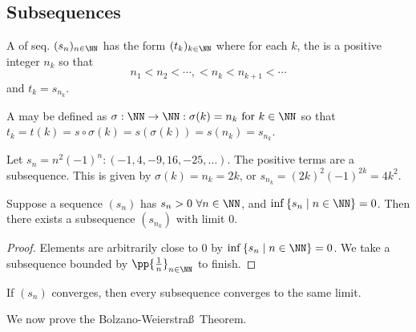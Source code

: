 \documentclass[11pt]{scrartcl}
\numberwithin{equation}{section}
\begin{document}
\subsection{Subsequences}
\begin{definition}
    A  of seq. $(s_n)_{n\in\NN}$ has the form 
    $(t_k)_{k\in\NN}$ where for each $k$, the is a positive integer 
    $n_k$ so that 
    \[ n_1 < n_2 <\cdots,< n_k<n_{k+1}<\cdots\]
    and $t_k = s_{n_k}$.
    
    A  may be defined as 
    $\sigma : \NN \rightarrow \NN: \sigma(k) = n_k \text{ for } k \in \NN$
    so that $t_k = t(k) =  s \circ \sigma (k) = s(\sigma(k)) = s(n_k) = s_{n_k}$.
\end{definition}
\begin{example}
    Let $s_n = n^2(-1)^n : (-1,4,-9,16,-25,\dots)$.
    The positive terms are a subsequence. This is given by 
    $\sigma(k) = n_k=2k$, or $s_{n_k}=(2k)^2(-1)^{2k} = 4k^2$.
\end{example}

\begin{proposition}
    Suppose a sequence $(s_n)$ has $s_n>0\ \forall n \in \NN$,
    and $\inf \left\{s_n\mid n\in \NN\right\} = 0$.
    Then there exists a subsequence $(s_{n_k})$ with limit $0$.
\end{proposition}

\begin{proof}
    Elements are arbitrarily close to $0$ by
    $\inf \left\{s_n\mid n \in\NN\right\} = 0$. 
    We take a subsequence bounded by $\pp{\frac{1}{n}}_{n\in\NN}$ 
    to finish.
\end{proof}

\begin{proposition}
    If $(s_n)$ converges, then every subsequence converges to the 
    same limit.
\end{proposition}

We now prove the Bolzano-Weierstra\ss \ Theorem.
\end{document}
